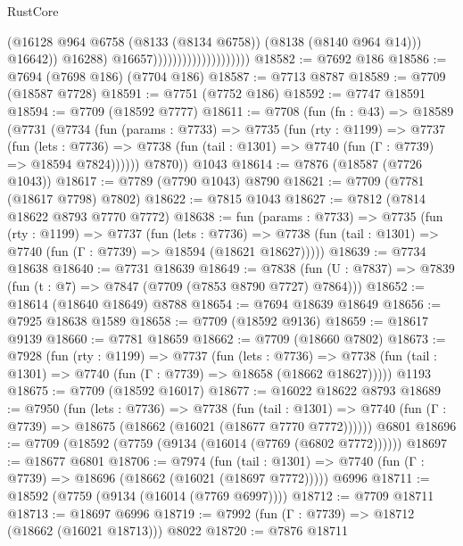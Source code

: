 \begin{lexlean}{RustCore}
\begin{coremodule}
                                                  (@16128
                                                    @964
                                                    @6758
                                                    (@8133 (@8134 @6758))
                                                    (@8138 (@8140 @964 @14)))
                                                  @16642))
                                              @16288)
                                            @16657))))))))))))))))))))
@18582 := @7692 @186
@18586 := @7694 (@7698 @186) (@7704 @186)
@18587 := @7713 @8787
@18589 := @7709 (@18587 @7728)
@18591 := @7751 (@7752 @186)
@18592 := @7747 @18591
@18594 := @7709 (@18592 @7777)
@18611 := @7708
    (fun (fn : @43) =>
    @18589
      (@7731
        (@7734
          (fun (params : @7733) =>
          @7735
            (fun (rty : @1199) =>
            @7737
              (fun (lets : @7736) =>
              @7738 (fun (tail : @1301) => @7740 (fun (Γ : @7739) => @18594 @7824))))))
        @7870))
    @1043
@18614 := @7876 (@18587 (@7726 @1043))
@18617 := @7789 (@7790 @1043) @8790
@18621 := @7709 (@7781 (@18617 @7798) @7802)
@18622 := @7815 @1043
@18627 := @7812 (@7814 @18622 @8793 @7770 @7772)
@18638 := fun (params : @7733) =>
  @7735
    (fun (rty : @1199) =>
    @7737
      (fun (lets : @7736) =>
      @7738 (fun (tail : @1301) => @7740 (fun (Γ : @7739) => @18594 (@18621 @18627)))))
@18639 := @7734 @18638
@18640 := @7731 @18639
@18649 := @7838 (fun (U : @7837) => @7839 (fun (t : @7) => @7847 (@7709 (@7853 @8790 @7727) @7864)))
@18652 := @18614 (@18640 @18649) @8788
@18654 := @7694 @18639 @18649
@18656 := @7925 @18638 @1589
@18658 := @7709 (@18592 @9136)
@18659 := @18617 @9139
@18660 := @7781 @18659
@18662 := @7709 (@18660 @7802)
@18673 := @7928
    (fun (rty : @1199) =>
    @7737
      (fun (lets : @7736) =>
      @7738 (fun (tail : @1301) => @7740 (fun (Γ : @7739) => @18658 (@18662 @18627)))))
    @1193
@18675 := @7709 (@18592 @16017)
@18677 := @16022 @18622 @8793
@18689 := @7950
    (fun (lets : @7736) =>
    @7738
      (fun (tail : @1301) =>
      @7740 (fun (Γ : @7739) => @18675 (@18662 (@16021 (@18677 @7770 @7772))))))
    @6801
@18696 := @7709 (@18592 (@7759 (@9134 (@16014 (@7769 (@6802 @7772))))))
@18697 := @18677 @6801
@18706 := @7974
    (fun (tail : @1301) => @7740 (fun (Γ : @7739) => @18696 (@18662 (@16021 (@18697 @7772)))))
    @6996
@18711 := @18592 (@7759 (@9134 (@16014 (@7769 @6997))))
@18712 := @7709 @18711
@18713 := @18697 @6996
@18719 := @7992 (fun (Γ : @7739) => @18712 (@18662 (@16021 @18713))) @8022
@18720 := @7876 @18711

\end{coremodule}
\end{lexlean}
